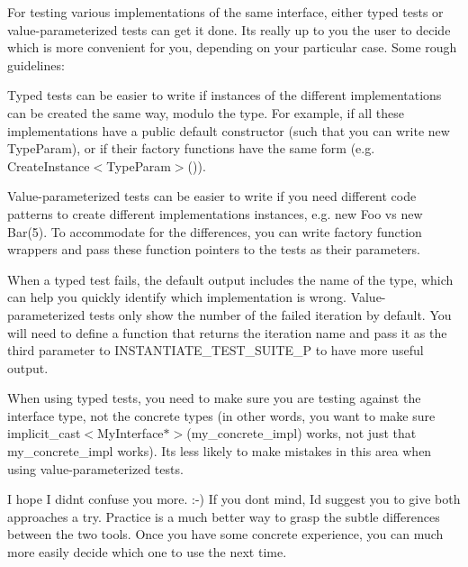 For testing various implementations of the same interface, either typed tests or value-\/parameterized tests can get it done. It\textquotesingle{}s really up to you the user to decide which is more convenient for you, depending on your particular case. Some rough guidelines\+:


\begin{DoxyItemize}
\item Typed tests can be easier to write if instances of the different implementations can be created the same way, modulo the type. For example, if all these implementations have a public default constructor (such that you can write {\ttfamily new Type\+Param}), or if their factory functions have the same form (e.\+g. {\ttfamily Create\+Instance$<$Type\+Param$>$()}).
\item Value-\/parameterized tests can be easier to write if you need different code patterns to create different implementations\textquotesingle{} instances, e.\+g. {\ttfamily new Foo} vs {\ttfamily new Bar(5)}. To accommodate for the differences, you can write factory function wrappers and pass these function pointers to the tests as their parameters.
\item When a typed test fails, the default output includes the name of the type, which can help you quickly identify which implementation is wrong. Value-\/parameterized tests only show the number of the failed iteration by default. You will need to define a function that returns the iteration name and pass it as the third parameter to I\+N\+S\+T\+A\+N\+T\+I\+A\+T\+E\+\_\+\+T\+E\+S\+T\+\_\+\+S\+U\+I\+T\+E\+\_\+P to have more useful output.
\item When using typed tests, you need to make sure you are testing against the interface type, not the concrete types (in other words, you want to make sure {\ttfamily implicit\+\_\+cast$<$My\+Interface$\ast$$>$(my\+\_\+concrete\+\_\+impl)} works, not just that {\ttfamily my\+\_\+concrete\+\_\+impl} works). It\textquotesingle{}s less likely to make mistakes in this area when using value-\/parameterized tests.
\end{DoxyItemize}

I hope I didn\textquotesingle{}t confuse you more. \+:-\/) If you don\textquotesingle{}t mind, I\textquotesingle{}d suggest you to give both approaches a try. Practice is a much better way to grasp the subtle differences between the two tools. Once you have some concrete experience, you can much more easily decide which one to use the next time.

